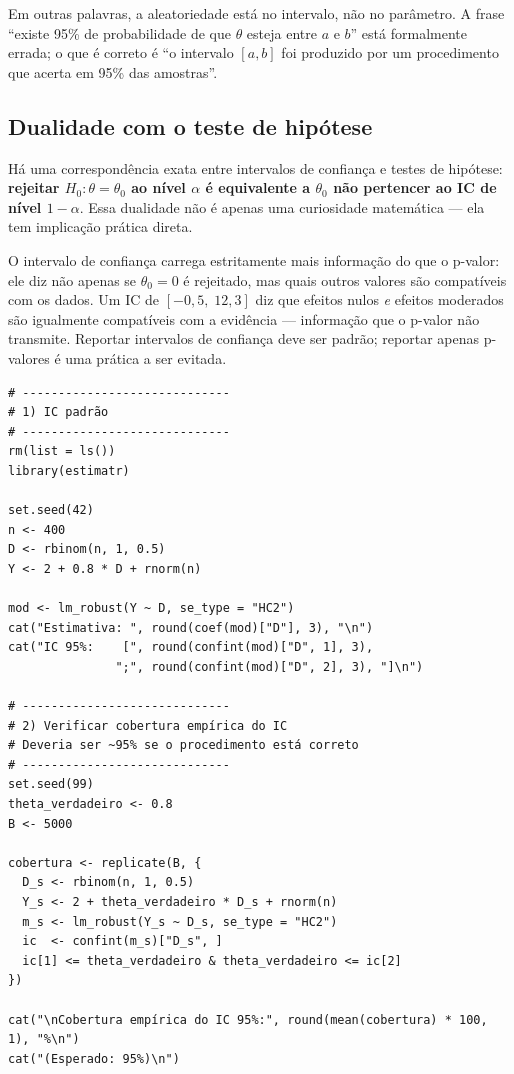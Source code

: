 Em outras palavras, a aleatoriedade está no intervalo, não no parâmetro. A frase ``existe 95\% de probabilidade de que $\theta$ esteja entre $a$ e $b$'' está formalmente errada; o que é correto é ``o intervalo $[a, b]$ foi produzido por um procedimento que acerta em 95\% das amostras''.

\subsection*{Dualidade com o teste de hipótese}

Há uma correspondência exata entre intervalos de confiança e testes de hipótese: \textbf{rejeitar $H_0: \theta = \theta_0$ ao nível $\alpha$ é equivalente a $\theta_0$ não pertencer ao IC de nível $1-\alpha$}. Essa dualidade não é apenas uma curiosidade matemática — ela tem implicação prática direta.

O intervalo de confiança carrega estritamente mais informação do que o p-valor: ele diz não apenas se $\theta_0 = 0$ é rejeitado, mas quais outros valores são compatíveis com os dados. Um IC de $[{-0{,}5},\; 12{,}3]$ diz que efeitos nulos \textit{e} efeitos moderados são igualmente compatíveis com a evidência — informação que o p-valor não transmite. Reportar intervalos de confiança deve ser padrão; reportar apenas p-valores é uma prática a ser evitada.

\begin{lstlisting}[style=Rstyle, caption={Intervalos de confiança: construção e simulação da cobertura}]
# -----------------------------
# 1) IC padrão
# -----------------------------
rm(list = ls())
library(estimatr)

set.seed(42)
n <- 400
D <- rbinom(n, 1, 0.5)
Y <- 2 + 0.8 * D + rnorm(n)

mod <- lm_robust(Y ~ D, se_type = "HC2")
cat("Estimativa: ", round(coef(mod)["D"], 3), "\n")
cat("IC 95%:    [", round(confint(mod)["D", 1], 3),
               ";", round(confint(mod)["D", 2], 3), "]\n")

# -----------------------------
# 2) Verificar cobertura empírica do IC
# Deveria ser ~95% se o procedimento está correto
# -----------------------------
set.seed(99)
theta_verdadeiro <- 0.8
B <- 5000

cobertura <- replicate(B, {
  D_s <- rbinom(n, 1, 0.5)
  Y_s <- 2 + theta_verdadeiro * D_s + rnorm(n)
  m_s <- lm_robust(Y_s ~ D_s, se_type = "HC2")
  ic  <- confint(m_s)["D_s", ]
  ic[1] <= theta_verdadeiro & theta_verdadeiro <= ic[2]
})

cat("\nCobertura empírica do IC 95%:", round(mean(cobertura) * 100, 1), "%\n")
cat("(Esperado: 95%)\n")
\end{lstlisting}


